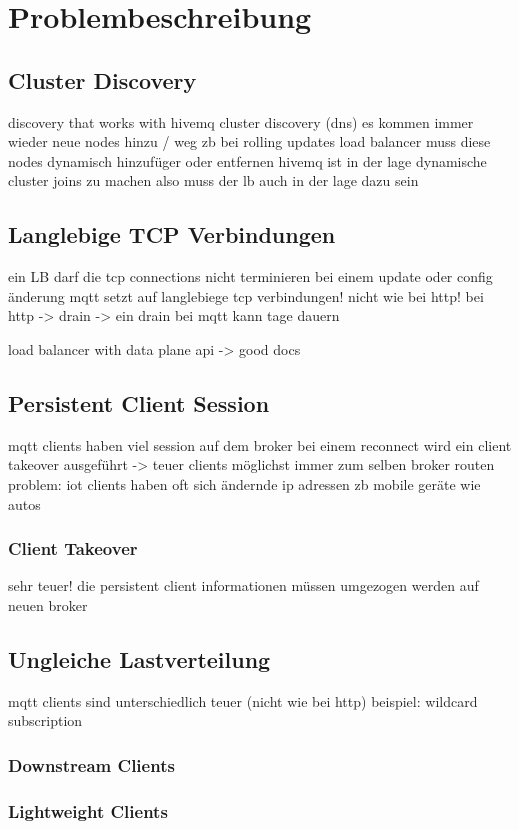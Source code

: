 \section{Problembeschreibung}

\subsection{Cluster Discovery}
discovery that works with hivemq cluster discovery (dns)
es kommen immer wieder neue nodes hinzu / weg zb bei rolling updates
load balancer muss diese nodes dynamisch hinzufüger oder entfernen
hivemq ist in der lage dynamische cluster joins zu machen also muss der lb auch in der lage dazu sein

\subsection{Langlebige TCP Verbindungen}
ein LB darf die tcp connections nicht terminieren bei einem update oder config änderung
mqtt setzt auf langlebiege tcp verbindungen! nicht wie bei http! bei http -> drain
-> ein drain bei mqtt kann tage dauern

load balancer with data plane api -> good docs
\subsection{Persistent Client Session}
mqtt clients haben viel session auf dem broker
bei einem reconnect wird ein client takeover ausgeführt -> teuer
clients möglichst immer zum selben broker routen
problem: iot clients haben oft sich ändernde ip adressen zb mobile geräte wie autos
\subsubsection{Client Takeover}
sehr teuer! die persistent client informationen müssen umgezogen werden auf neuen broker

\subsection{Ungleiche Lastverteilung}
mqtt clients sind unterschiedlich teuer (nicht wie bei http)
beispiel: wildcard subscription

\subsubsection{Downstream Clients}
\subsubsection{Lightweight Clients}
